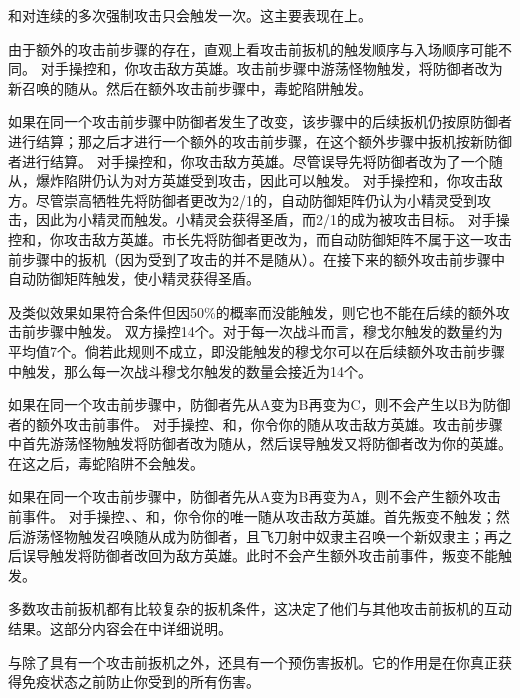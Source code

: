 \exception {}和对连续的多次强制攻击只会触发一次。这主要表现在上。

由于额外的攻击前步骤的存在，直观上看攻击前扳机的触发顺序与入场顺序可能不同。
\example 对手操控和，你攻击敌方英雄。攻击前步骤中游荡怪物触发，将防御者改为新召唤的随从。然后在额外攻击前步骤中，毒蛇陷阱触发。

如果在同一个攻击前步骤中防御者发生了改变，该步骤中的后续扳机仍按原防御者进行结算；那之后才进行一个额外的攻击前步骤，在这个额外步骤中扳机按新防御者进行结算。
\example 对手操控和，你攻击敌方英雄。尽管误导先将防御者改为了一个随从，爆炸陷阱仍认为对方英雄受到攻击，因此可以触发。
\example 对手操控和，你攻击敌方。尽管崇高牺牲先将防御者更改为2/1的，自动防御矩阵仍认为小精灵受到攻击，因此为小精灵而触发。小精灵会获得圣盾，而2/1的成为被攻击目标。
\example 对手操控和，你攻击敌方英雄。市长先将防御者更改为，而自动防御矩阵不属于这一攻击前步骤中的扳机（因为受到了攻击的并不是随从）。在接下来的额外攻击前步骤中自动防御矩阵触发，使小精灵获得圣盾。

及类似效果如果符合条件但因50\%的概率而没能触发，则它也不能在后续的额外攻击前步骤中触发。
\example 双方操控14个。对于每一次战斗而言，穆戈尔触发的数量约为平均值7个。倘若此规则不成立，即没能触发的穆戈尔可以在后续额外攻击前步骤中触发，那么每一次战斗穆戈尔触发的数量会接近为14个。

如果在同一个攻击前步骤中，防御者先从A变为B再变为C，则不会产生以B为防御者的额外攻击前事件。
\example 对手操控、和，你令你的随从攻击敌方英雄。攻击前步骤中首先游荡怪物触发将防御者改为随从，然后误导触发又将防御者改为你的英雄。在这之后，毒蛇陷阱不会触发。

如果在同一个攻击前步骤中，防御者先从A变为B再变为A，则不会产生额外攻击前事件。
\example 对手操控、、和，你令你的唯一随从攻击敌方英雄。首先叛变不触发；然后游荡怪物触发召唤随从成为防御者，且飞刀射中奴隶主召唤一个新奴隶主；再之后误导触发将防御者改回为敌方英雄。此时不会产生额外攻击前事件，叛变不能触发。

多数攻击前扳机都有比较复杂的扳机条件，这决定了他们与其他攻击前扳机的互动结果。这部分内容会在中详细说明。

与除了具有一个攻击前扳机之外，还具有一个预伤害扳机。它的作用是在你真正获得免疫状态之前防止你受到的所有伤害。


